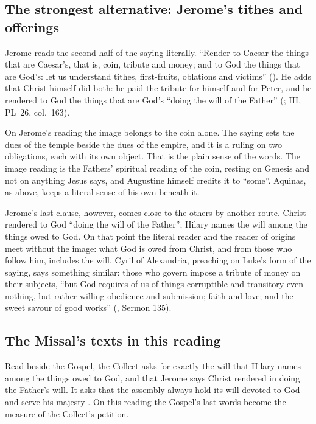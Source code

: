 \subsection{The strongest alternative: Jerome's tithes and offerings}

Jerome reads the second half of the saying literally. ``Render to Caesar the
things that are Caesar's, that is, coin, tribute and money; and to God the things that are
God's: let us understand tithes, first-fruits, oblations and victims''
(). He adds that Christ himself did both: he paid the tribute for
himself and for Peter, and he rendered to God the things that are God's
``doing the will of the Father'' (;
 III, PL~26, col.~163).

On Jerome's reading the image belongs to the coin alone. The saying sets the
dues of the temple beside the dues of the empire, and it is a ruling on two
obligations, each with its own object. That is the plain sense of the words.
The image reading is the Fathers' spiritual reading of the coin, resting on
Genesis and not on anything Jesus says, and Augustine himself credits it to
``some''. Aquinas, as above, keeps a literal sense of his own beneath it.

Jerome's last clause, however, comes close to the others by another route.
Christ rendered to God ``doing the will of the Father''; Hilary names the will
among the things owed to God. On that point the literal reader and the reader
of origins meet without the image: what God is owed from Christ, and from those
who follow him, includes the will. Cyril of Alexandria, preaching on Luke's
form of the saying, says something similar: those who govern impose a tribute of money on their subjects, ``but God
requires of us of things corruptible and transitory even nothing, but rather
willing obedience and submission; faith and love; and the sweet savour of good
works'' (, Sermon 135).

\subsection{The Missal's texts in this reading}

Read beside the Gospel, the Collect asks for exactly the will that Hilary names
among the things owed to God, and that Jerome says Christ rendered in doing the
Father's will. It asks that the assembly always hold its will devoted to God
and serve his majesty . On this reading the Gospel's last
words become the measure of the Collect's petition.

